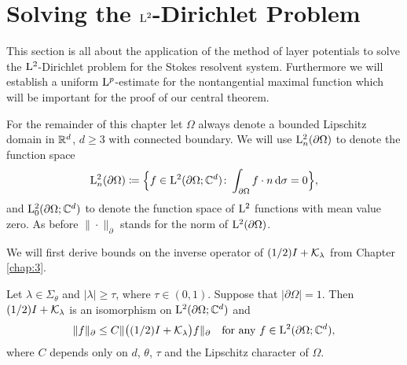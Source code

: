 \chapter{Solving the $\mathrm{L}^2$-Dirichlet Problem}

This section is all about the application of the method of layer potentials to solve the $\mathrm{L}^2$-Dirichlet problem for the Stokes resolvent system.
Furthermore we will establish a uniform $\mathrm{L}^p$-estimate for the nontangential maximal function which will be important for the proof of our central theorem.

For the remainder of this chapter let $\Omega$ always denote a bounded Lipschitz domain in $\mathbb{R}^d$, $d \geq 3$ with connected boundary.
We will use $\mathrm{L}^2_n(\partial\Omega)$ to denote the function space
\begin{align*}
  \mathrm{L}^2_n(\partial\Omega) \coloneqq \Big\{ f \in \mathrm{L}^2(\partial\Omega; \mathbb{C}^d) \colon \int_{\partial\Omega} f \cdot n \, {\operatorname{d}\!{\sigma}} = 0 \Big\},
\end{align*}
and $\mathrm{L}_0^2(\partial\Omega; \mathbb{C}^d)$  to denote the function space of $\mathrm{L}^2$ functions with mean value zero.
As before $\| \cdot \|_\partial$ stands for the norm of $\mathrm{L}^2(\partial\Omega)$.

We will first derive bounds on the inverse operator of $(1/2) I + \mathcal{K}_\lambda$ from Chapter \ref{chap:3}.

\begin{lem}
  Let $\lambda \in \Sigma_\theta$ and $|\lambda| \geq \tau$, where $\tau \in (0,1)$.
  Suppose that $|\partial\Omega| = 1$.
  Then $(1/2)I + \mathcal{K}_\lambda$ is an isomorphism on $\mathrm{L}^2(\partial\Omega; \mathbb{C}^d)$ and
  \begin{align}
    \label{eq:inverseEstimate}
    \| f\|_\partial \leq C \|\big( (1/2) I + \mathcal{K}_\lambda \big) f \|_\partial \quad\text{for any } f \in \mathrm{L}^2(\partial\Omega; \mathbb{C}^d),
  \end{align}
  where $C$ depends only on $d$, $\theta$, $\tau$ and the Lipschitz character of $\Omega$.
\end{lem}

